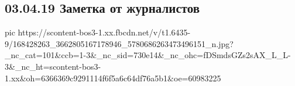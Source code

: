  
 
 
 
 

\subsection{03.04.19 Заметка от журналистов}
\label{sec:05_04_2021.fb.bizin_nikolaj.1.anna_tuv_donbass}


\ifcmt
  pic https://scontent-bos3-1.xx.fbcdn.net/v/t1.6435-9/168428263_3662805167178946_5780686263473496151_n.jpg?_nc_cat=101&ccb=1-3&_nc_sid=730e14&_nc_ohc=fDSmdsGZs2sAX_L_L-3&_nc_ht=scontent-bos3-1.xx&oh=6366369c9291114f6f5a6c64df76a5b1&oe=60983225
\fi


